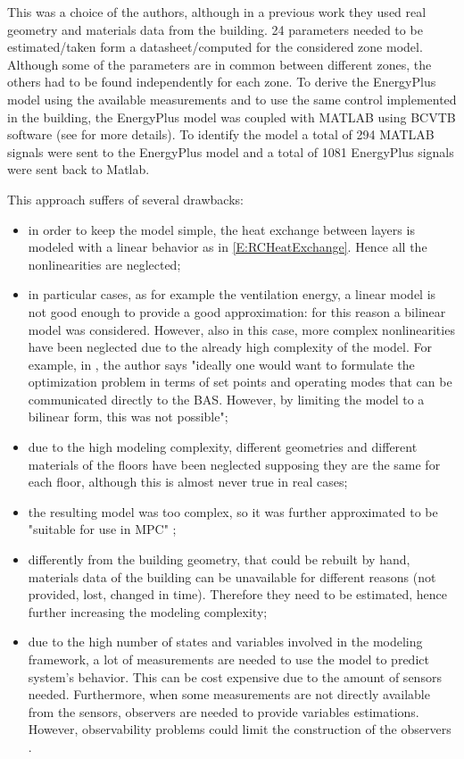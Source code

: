 {This was a choice of the authors, although in a previous work they used real geometry and materials data from the building. 24 parameters needed to be estimated/taken form a datasheet/computed for the considered zone model.
Although some of the parameters are in common between different zones, the others had to be found independently for each zone.
To derive the EnergyPlus model using the available measurements and to use the same control implemented in the building, the EnergyPlus model was coupled with MATLAB using BCVTB software (see \cite{SturzeneggerTR} for more details). To identify the model a total of 294 MATLAB signals were sent to the EnergyPlus model and a total of 1081 EnergyPlus signals were sent back to Matlab.}

\textcolor[rgb]{0,0,1}{This approach suffers of several drawbacks:
\begin{itemize}
	\item in order to keep the model simple, the heat exchange between layers is modeled with a linear behavior as in \eqref{E:RCHeatExchange}. Hence all the nonlinearities are neglected;
	\item in particular cases, as for example the ventilation energy, a linear model is not good enough to provide a good approximation: for this reason a bilinear model was considered.
	However, also in this case, more complex nonlinearities have been neglected due to the already high complexity of the model.
	For example, in \cite{Sturzenegger2016}, the author says "ideally one would want to formulate the optimization problem in terms of set points and operating modes that can be communicated directly to the BAS.
	However, by limiting the model to a bilinear form, this was not possible";
	\item due to the high modeling complexity, different geometries and different materials of the floors have been neglected supposing they are the same for each floor, although this is almost never true in real cases;  
	\item the resulting model was too complex, so it was further approximated to be "suitable for use in MPC" \cite{SturzeneggerTR};
	\item differently from the building geometry, that could be rebuilt by hand, materials data of the building can be unavailable for different reasons (not provided, lost, changed in time).
	Therefore they need to be estimated, hence further increasing the modeling complexity;
	\item due to the high number of states and variables involved in the modeling framework, a lot of measurements are needed to use the model to predict system's behavior.
	This can be cost expensive due to the amount of sensors needed.
	Furthermore, when some measurements are not directly available from the sensors, observers are needed to provide variables estimations.
	However, observability problems could limit the construction of the observers \cite{Dorf2011MCS}. 
\end{itemize}
}

